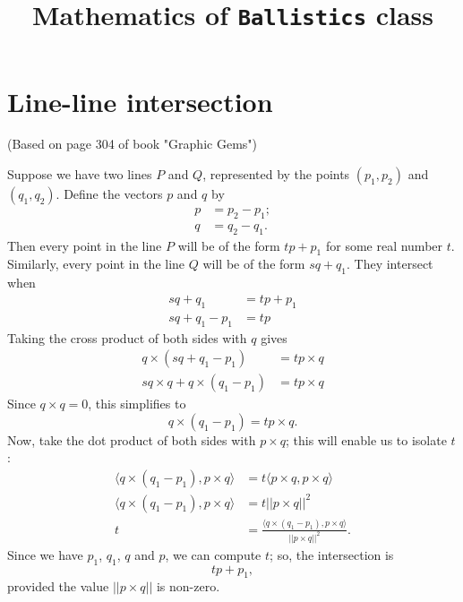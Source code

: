\documentclass{article}
\begin{document}
\title{Mathematics of \texttt{Ballistics} class}
\date{}
\maketitle

\section{Line-line intersection}

(Based on page 304 of book "Graphic Gems")

Suppose we have two lines $P$ and $Q$,
represented by the points $(p_1, p_2)$ and $(q_1, q_2)$.
Define the vectors $p$ and $q$ by
\begin{align*}
    p &= p_2 - p_1; \\
    q &= q_2 - q_1.
\end{align*}
Then every point in the line $P$ will be of the form $tp + p_1$
for some real number $t$.
Similarly, every point in the line $Q$ will be of the form $sq + q_1$.
They intersect when
\begin{align*}
    sq + q_1 &= tp + p_1 \\
    sq + q_1 - p_1 &= tp
\end{align*}
Taking the cross product of both sides with $q$ gives
\begin{align*}
    q \times (sq + q_1 - p_1) &= t p \times q \\
    s q \times q + q \times (q_1 - p_1) &= t p \times q
\end{align*}
Since $q \times q = 0$, this simplifies to
\begin{equation*}
    q \times (q_1 - p_1) = t p \times q.
\end{equation*}
Now, take the dot product of both sides with $p \times q$;
this will enable us to isolate $t$:
\begin{align*}
    \langle q \times (q_1 - p_1), p \times q \rangle
        &= t \langle p \times q, p \times q \rangle \\
    \langle q \times (q_1 - p_1), p \times q \rangle &= t ||p \times q||^2 \\
    t &= \frac{\langle q \times(q_1 - p_1), p \times q \rangle}{||p \times q||^2}.
\end{align*}
Since we have $p_1$, $q_1$, $q$ and $p$, we can compute $t$;
so, the intersection is
\begin{equation*}
    tp + p_1,
\end{equation*}
provided the value $|| p \times q ||$ is non-zero.
\end{document}
